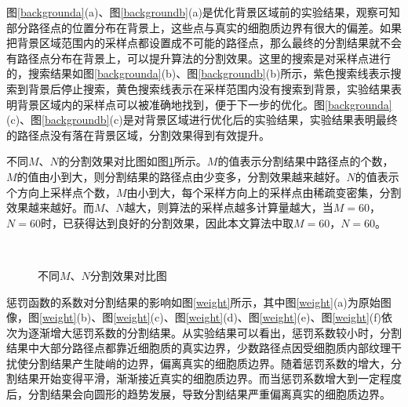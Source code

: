 \documentclass[nomlist,masters]{seuthesix}
\begin{document}
图\ref{backgrounda}(a)、图\ref{backgroundb}(a)是优化背景区域前的实验结果，观察可知部分路径点的位置分布在背景上，这些点与真实的细胞质边界有很大的偏差。如果把背景区域范围内的采样点都设置成不可能的路径点，那么最终的分割结果就不会有路径点分布在背景上，可以提升算法的分割效果。这里的搜索是对采样点进行的，搜索结果如图\ref{backgrounda}(b)、图\ref{backgroundb}(b)所示，紫色搜索线表示搜索到背景后停止搜索，黄色搜索线表示在采样范围内没有搜索到背景，实验结果表明背景区域内的采样点可以被准确地找到，便于下一步的优化。图\ref{backgrounda}(c)、图\ref{backgroundb}(c)是对背景区域进行优化后的实验结果，实验结果表明最终的路径点没有落在背景区域，分割效果得到有效提升。

不同$M$、$N$的分割效果对比图如图\ref{MN}所示。$M$的值表示分割结果中路径点的个数，$M$的值由小到大，则分割结果的路径点由少变多，分割效果越来越好。$N$的值表示个方向上采样点个数，$M$由小到大，每个采样方向上的采样点由稀疏变密集，分割效果越来越好。而$M$、$N$越大，则算法的采样点越多计算量越大，当$M=60$，$N=60$时，已获得达到良好的分割效果，因此本文算法中取$M=60$，$N=60$。

\begin{figure}[H]
\centering 
\hspace{0.01\textwidth}
\hspace{0.01\textwidth}
\vfill
\centering 
\hspace{0.01\textwidth}
\hspace{0.01\textwidth}
\caption{不同$M$、$N$分割效果对比图}
\label{MN}
\end{figure}

惩罚函数的系数对分割结果的影响如图\ref{weight}所示，其中图\ref{weight}(a)为原始图像，图\ref{weight}(b)、图\ref{weight}(c)、图\ref{weight}(d)、图\ref{weight}(e)、图\ref{weight}(f)依次为逐渐增大惩罚系数的分割结果。从实验结果可以看出，惩罚系数较小时，分割结果中大部分路径点都靠近细胞质的真实边界，少数路径点因受细胞质内部纹理干扰使分割结果产生陡峭的边界，偏离真实的细胞质边界。随着惩罚系数的增大，分割结果开始变得平滑，渐渐接近真实的细胞质边界。而当惩罚系数增大到一定程度后，分割结果会向圆形的趋势发展，导致分割结果严重偏离真实的细胞质边界。
\end{document}
